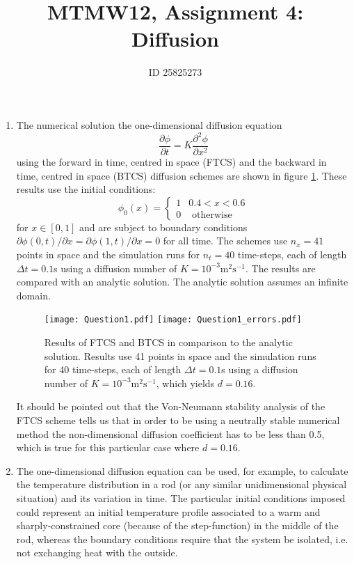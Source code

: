 \documentclass[12pt]{article}
\begin{document}
\thispagestyle{empty}

\title{MTMW12, Assignment 4: Diffusion}
\author{ID 25825273}
\maketitle


\begin{enumerate}

\item The numerical solution the one-dimensional diffusion equation
\begin{equation}
\frac{\partial\phi}{\partial t}=K\frac{\partial^{2}\phi}{\partial x^{2}}
\end{equation}
using the forward in time, centred in space (FTCS) and the backward
in time, centred in space (BTCS) diffusion schemes are shown in figure
\ref{fig:Q1}. These results use the initial conditions: 
\[
\phi_{0}(x)=\begin{cases}
1 & 0.4<x<0.6\\
0 & \text{ otherwise}
\end{cases}
\]
for $x\in[0,1]$ and are subject to boundary conditions $\partial\phi(0,t)/\partial x=\partial\phi(1,t)/\partial x=0$
for all time. The schemes use $n_{x}=41$ points in space and the
simulation runs for $n_{t}=40$ time-steps, each of length $\Delta t=0.1$s
using a diffusion number of $K=10^{-3}\text{m}^{2}\text{s}^{-1}$. The results are
compared with an analytic solution. The analytic solution assumes
an infinite domain.

\begin{figure}[!tbh]
\texttt{[image: Question1.pdf]}
\texttt{[image: Question1\_errors.pdf]}

\caption{Results of FTCS and BTCS in comparison to the analytic solution. Results
use 41 points in space and the simulation runs for 40 time-steps,
each of length $\Delta t=0.1$s using a diffusion number of $K=10^{-3}\text{m}^{2}\text{s}^{-1}$, which yields $d=0.16$.
\label{fig:Q1}}
\end{figure}

It should be pointed out that the Von-Neumann stability analysis of the FTCS scheme tells us that in order to be using a neutrally stable numerical method the non-dimensional diffusion coefficient has to be less than 0.5, which is true for this particular case where $d=0.16$.


\item The one-dimensional diffusion equation can be used, for example, to
calculate the temperature distribution in a rod (or any similar unidimensional physical situation) and its variation in time. The particular initial conditions imposed could represent an initial temperature profile associated to a warm and sharply-constrained core (because of the step-function) in the middle of the rod, whereas the boundary conditions require that the system be isolated, i.e. not exchanging heat with the outside.


\end{enumerate}
\end{document}
